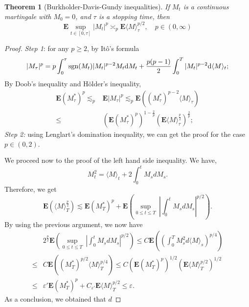 \documentclass[twoside, 12pt]{book}
\numberwithin{equation}{chapter}
\newtheorem{theorem}{Theorem}[section]
\def\bE{{\mathbf E}}
\def\geq{\geqslant}
\def\leq{\leqslant}
\def\le{\leqslant}
\def\d{\text{\rm{d}}}
\def\eps{\varepsilon}
\begin{document}
	\begin{theorem}[{Burkholder-Davis-Gundy inequalities}]
		If $M_t$ is a continuous martingale with $M_0=0$, and $\tau$ is a stopping time, then 
		\begin{equation}\label{eq:bdg}
			\bE \sup_{t\in[0,\tau]} |M_t|^p \asymp_p \bE \langle M\rangle_\tau^{p/2}, \quad p\in (0,\infty) 
		\end{equation}
	\end{theorem}
	\begin{proof}
		{\em Step 1}: for any $p\geq 2$, by It\^o's formula 
					\[
					|M_\tau|^p = p \int_0^\tau \mathrm{sgn}(M_t)|M_t|^{p-2} M_t \d M_t + \frac{p(p-1)}{2}\int_0^T |M_t|^{p-2} \d \langle M \rangle_t ;
					\]
			By Doob's inequality and H\"older's inequality, 
			\[
					\begin{aligned}
						\bE (M_\tau^*)^p\lesssim_p& \bE |M_\tau|^p  \lesssim_p \bE ( (M_\tau^*)^{p-2} \langle M \rangle_\tau)\\
						\leq& (\bE(M_\tau^*)^p)^{1-\frac{2}{p}} (\bE \langle M \rangle_\tau^{\frac{p}{2}} )^{\frac{2}{p}}; 
					\end{aligned}
			\]
			{\em Step 2:} using Lenglart's domination inequality, 
			 we can get the proof for the case $p\in (0,2)$. 
			 
			 We proceed now to the proof of the left hand side inequality. We have,
			 $$
			     M_t^2 =\langle M \rangle_t +2\int_0^t M_s dM_s.
			 $$
			 Therefore, we get
			 $$
			     \mathbf{E} \left( \langle M\rangle_T^{\frac{p}{2} } \right) \lesssim   \mathbf{E} (M_T^*)^p +  \mathbf{E}\left(\sup_{0 \le t \le T}\ \left| \int_0^t M_s dM_s\right|^{p/2} \right) .
			 $$
			 By using the previous argument, we now have
			 \begin{equation*}
			 	\begin{aligned}
			 		&2^{\frac{p}{2}}\mathbf{E}\left(\sup_{0 \le t \le T}\ \left| \int_0^t M_s dM_s\right|^{p/2} \right)  \le C \mathbf{E}\left( \left( \int_0^T M^2_s d\langle M\rangle_s\right)^{p/4} \right)\\
			 		\leq  & C \mathbf{E}\left((M_T^*)^{p/2} \langle M \rangle_T^{p/4} \right)
			 		\leq C  \left( \mathbf{E} (M_T^*)^{p}\right)^{1/2}  \left( \mathbf{E}  \langle M \rangle_T^{p/2} \right)^{1/2}\\
			 		\leq & \eps'  \mathbf{E} (M_T^*)^{p} + C_{\eps'} \mathbf{E}  \langle M \rangle_T^{p/2} \leq \eps .
			 	\end{aligned}
			 \end{equation*}			 
			 As a conclusion, we obtained that $d$
	\end{proof}
	
\end{document}
